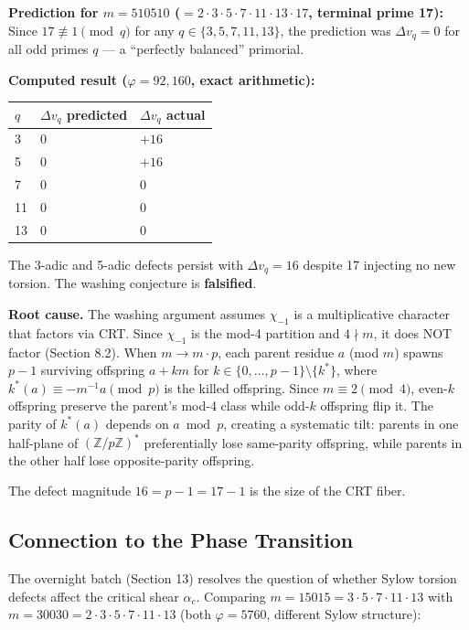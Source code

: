 \documentclass[11pt,letterpaper]{article}
\theoremstyle{definition}
\theoremstyle{remark}
\begin{document}
\textbf{Prediction for $m = 510510$ ($= 2 \cdot 3 \cdot 5 \cdot 7 \cdot 11 \cdot 13 \cdot 17$, terminal prime 17):} Since $17 \not\equiv 1 \pmod{q}$ for any $q \in \{3, 5, 7, 11, 13\}$, the prediction was $\Delta v_q = 0$ for all odd primes $q$ --- a ``perfectly balanced'' primorial.

\textbf{Computed result ($\varphi = 92{,}160$, exact arithmetic):}

\begin{longtable}[]{@{}lll@{}}
\toprule
$q$ & $\Delta v_q$ predicted & $\Delta v_q$ actual \\
\midrule
\endhead
\bottomrule
3 & 0 & $+16$ \\
5 & 0 & $+16$ \\
7 & 0 & 0 \\
11 & 0 & 0 \\
13 & 0 & 0 \\
\end{longtable}

The 3-adic and 5-adic defects persist with $\Delta v_q = 16$ despite 17 injecting no new torsion. The washing conjecture is \textbf{falsified}.

\textbf{Root cause.} The washing argument assumes $\chi_{-1}$ is a multiplicative character that factors via CRT. Since $\chi_{-1}$ is the mod-4 partition and $4 \nmid m$, it does NOT factor (Section 8.2). When $m \to m \cdot p$, each parent residue $a$ (mod $m$) spawns $p-1$ surviving offspring $a + km$ for $k \in \{0, \ldots, p-1\} \setminus \{k^*\}$, where $k^*(a) \equiv -m^{-1} a \pmod{p}$ is the killed offspring. Since $m \equiv 2 \pmod{4}$, even-$k$ offspring preserve the parent's mod-4 class while odd-$k$ offspring flip it. The parity of $k^*(a)$ depends on $a \bmod p$, creating a systematic tilt: parents in one half-plane of $(\mathbb{Z}/p\mathbb{Z})^*$ preferentially lose same-parity offspring, while parents in the other half lose opposite-parity offspring.

The defect magnitude $16 = p - 1 = 17 - 1$ is the size of the CRT fiber.

\subsection{Connection to the Phase Transition}\label{connection-to-the-phase-transition}

The overnight batch (Section 13) resolves the question of whether Sylow torsion defects affect the critical shear $\alpha_c$. Comparing $m = 15015 = 3 \cdot 5 \cdot 7 \cdot 11 \cdot 13$ with $m = 30030 = 2 \cdot 3 \cdot 5 \cdot 7 \cdot 11 \cdot 13$ (both $\varphi = 5760$, different Sylow structure):
\end{document}
